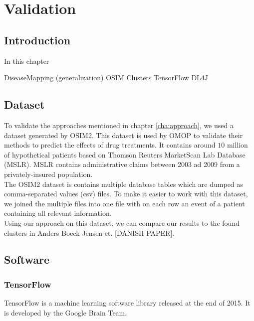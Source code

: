 \graphicspath{ {Implementation/Images/} }


\chapter{Validation}
\label{cha:implementation}

\section{Introduction}
In this chapter 

DiseaseMapping (generalization)
OSIM
Clusters
TensorFlow
DL4J


\section{Dataset}

To validate the approaches mentioned in chapter \ref{cha:approach}, we used a dataset generated by OSIM2. This dataset is used by OMOP to validate their methods to predict the effects of drug treatments. It contains around $10$ million of hypothetical patients based on Thomson Reuters MarketScan Lab Database (MSLR). MSLR contains administrative claims between 2003 ad 2009 from a privately-insured population. \\

The OSIM2 dataset is contains multiple database tables which are dumped as comma-separated values (csv) files. To make it easier to work with this dataset, we joined the multiple files into one file with on each row an event of a patient containing all relevant information. \\

Using our approach on this dataset, we can compare our results to the found clusters in Anders Boeck Jensen et. [DANISH PAPER].


\section{Software}

\subsection{TensorFlow}

TensorFlow is a machine learning software library released at the end of 2015. It is developed by the Google Brain Team. \\




